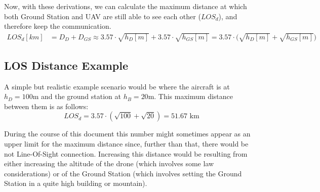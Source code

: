 Now, with these derivations, we can calculate the maximum distance at which both Ground Station and UAV are still able to see each other ($LOS_{d}$), and therefore keep the communication.
\begin{align}
	LOS_d[km]	 &= D_D + D_{GS} \approx 3.57\cdot \sqrt{h_D[m]} + 3.57\cdot \sqrt{h_{GS}[m]} = {3.57\cdot (\sqrt{h_D[m]} + \sqrt{h_{GS}[m]}} )
\end{align}

\subsection*{LOS Distance Example}
A simple but realistic example scenario would be where the aircraft is at $h_D = 100$m and the ground station at $h_B = 20$m. This maximum distance between them is as follows:
\begin{equation*}
	LOS_d = 3.57\cdot (\sqrt{100} + \sqrt{20}) = 51.67 \text{ km}
\end{equation*}

During the course of this document this number might sometimes appear as an upper limit for the maximum distance since, further than that, there would be not Line-Of-Sight connection. Increasing this distance would be resulting from either increasing the altitude of the drone (which involves some law considerations) or of the Ground Station (which involves setting the Ground Station in a quite high building or mountain).




